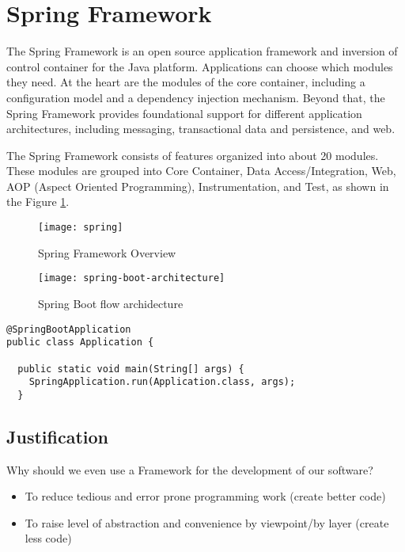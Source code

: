 \section{Spring Framework}
The Spring Framework is an open source application framework and inversion of control container for the Java platform. Applications can choose which modules they need. At the heart are the modules of the core container, including a configuration model and a dependency injection mechanism. Beyond that, the Spring Framework provides foundational support for different application architectures, including messaging, transactional data and persistence, and web.

The Spring Framework consists of features organized into about 20 modules. These modules are grouped into Core Container, Data Access/Integration, Web, AOP (Aspect Oriented Programming), Instrumentation, and Test, as shown in the Figure \ref{fig:springframework}.

\begin{figure}[H]
  \center
  \texttt{[image: spring]}
  \caption{Spring Framework Overview}
  \label{fig:springframework}
\end{figure}

\begin{figure}[H]
  \center
  \texttt{[image: spring-boot-architecture]}
  \caption{Spring Boot flow archidecture}
\end{figure}

\pagebreak
\begin{lstlisting}
@SpringBootApplication
public class Application {
  
  public static void main(String[] args) {
    SpringApplication.run(Application.class, args);
  }  
\end{lstlisting}


\subsection{Justification}
Why should we even use a Framework for the development of our software?
\begin{itemize}
  \item To reduce tedious and error prone programming work (create better code)
  \item To raise level of abstraction and convenience by viewpoint/by layer (create less code)
\end{itemize}


